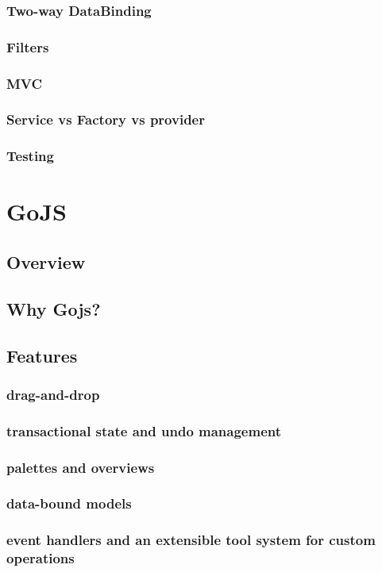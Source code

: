 \documentclass[14pt,a4paper]{extreport}
\begin{document}
			\subsubsection{Two-way DataBinding}
			\subsubsection{Filters}
			\subsubsection{MVC}
			\subsubsection{Service vs Factory vs provider}
			\subsubsection{Testing}
	\section{GoJS}
		\subsection{Overview}
		\subsection{Why Gojs?}
		\subsection{Features}
			\subsubsection{drag-and-drop}
			\subsubsection{transactional state and undo management}
			\subsubsection{palettes and	 overviews}
			\subsubsection{data-bound models}
			\subsubsection{event handlers and an extensible tool system for custom operations}
\end{document}
